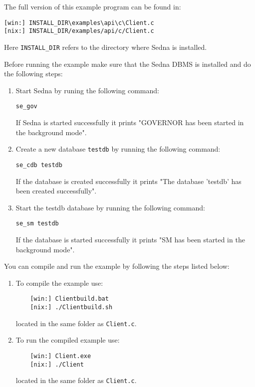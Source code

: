 \documentclass[a4paper,12pt]{article}
\begin{document}
The full version of this example program can be found in:
\begin{verbatim}
[win:] INSTALL_DIR\examples\api\c\Client.c
[nix:] INSTALL_DIR/examples/api/c/Client.c
\end{verbatim}

Here \verb!INSTALL_DIR! refers to the directory where Sedna is installed.

Before running the example make sure that the Sedna DBMS is installed and do the
following steps:

\begin{enumerate}
\item Start Sedna by runing the following command:
\begin{verbatim}
se_gov
\end{verbatim}
If Sedna is started successfully it prints "GOVERNOR has been started in
the background mode".
\item Create a new database \verb!testdb! by running the following command:
\begin{verbatim}
se_cdb testdb
\end{verbatim}
If the database is created successfully it prints "The database 'testdb' has
been created successfully".
\item Start the testdb database by running the following command:
\begin{verbatim}
se_sm testdb
\end{verbatim}
If the database is started successfully it prints "SM has been started in
the background mode".
\end{enumerate}

You can compile and run the example by following the steps listed below:

\begin{enumerate}
\item To compile the example use:
\begin{verbatim}
    [win:] Clientbuild.bat
    [nix:] ./Clientbuild.sh
\end{verbatim}
located in the same folder as \verb!Client.c!.

\item To run the compiled example use:
\begin{verbatim}
    [win:] Client.exe
    [nix:] ./Client
\end{verbatim}
located in the same folder as \verb!Client.c!.
\end{enumerate}


\end{document}
